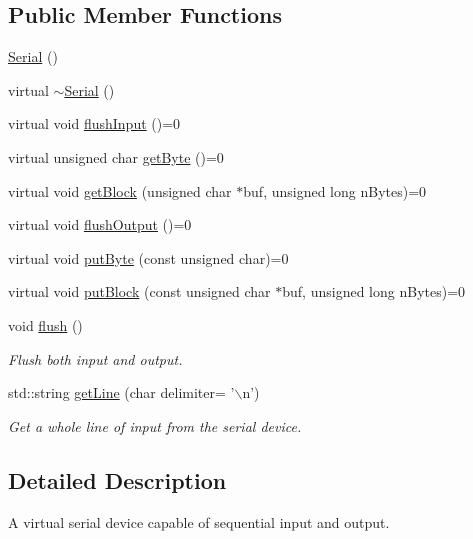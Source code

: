 \subsection*{\-Public \-Member \-Functions}
\begin{DoxyCompactItemize}
\item 
\hyperlink{classmetrobotics_1_1Serial_a3f15b64bdd4d3e3a87fb35be2b0c0bb3}{\-Serial} ()
\item 
virtual \hyperlink{classmetrobotics_1_1Serial_a962c1b0903cb3d2f4bd08228ae517492}{$\sim$\-Serial} ()
\item 
virtual void \hyperlink{classmetrobotics_1_1Serial_a7946553df09777c6db4afbcde2e318c2}{flush\-Input} ()=0
\item 
virtual unsigned char \hyperlink{classmetrobotics_1_1Serial_af9d195d4c2982d49e99e9eef25f439f1}{get\-Byte} ()=0
\item 
virtual void \hyperlink{classmetrobotics_1_1Serial_a2c54f800173e4e9c07337d92d8d4fb3b}{get\-Block} (unsigned char $\ast$buf, unsigned long n\-Bytes)=0
\item 
virtual void \hyperlink{classmetrobotics_1_1Serial_afe9e31faf7359119772ca1b5790f9a83}{flush\-Output} ()=0
\item 
virtual void \hyperlink{classmetrobotics_1_1Serial_a0188471ec0f240d4b4ec180eaf95fc4a}{put\-Byte} (const unsigned char)=0
\item 
virtual void \hyperlink{classmetrobotics_1_1Serial_af68a49b11d256035d651107781a1112c}{put\-Block} (const unsigned char $\ast$buf, unsigned long n\-Bytes)=0
\item 
void \hyperlink{classmetrobotics_1_1Serial_a63b7abf172cad25bfc998b3b1f98310f}{flush} ()
\begin{DoxyCompactList}\small\item\em \-Flush both input and output. \end{DoxyCompactList}\item 
std\-::string \hyperlink{classmetrobotics_1_1Serial_a5a22b8c2ecb89449c3d32353fdab5391}{get\-Line} (char delimiter= '$\backslash$n')
\begin{DoxyCompactList}\small\item\em \-Get a whole line of input from the serial device. \end{DoxyCompactList}\end{DoxyCompactItemize}


\subsection{\-Detailed \-Description}
\-A virtual serial device capable of sequential input and output. 

